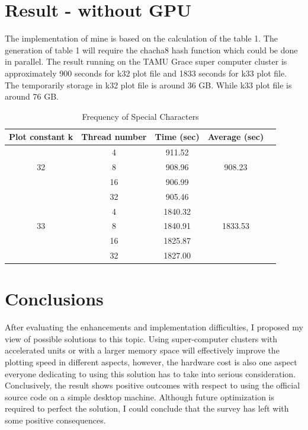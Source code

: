 \documentclass[sigconf, nonacm, natbib=false]{acmart}
\begin{document}
\section{Result - without GPU}
The implementation of mine is based on the calculation of the table 1. The generation of table 1 will require the chacha8 hash function which could be done in parallel. The result running on the TAMU Grace super computer cluster is approximately 900 seconds for k32 plot file and 1833 seconds for k33 plot file. The temporarily storage in k32 plot file is around 36 GB. While k33 plot file is around 76 GB. 
\begin{table}
  \caption{Frequency of Special Characters}
  \label{tab:freq}
  \begin{tabular}{ccccl}
    \toprule
    Plot constant k&Thread number&Time (sec)&Average (sec)\\
    \midrule
      & 4   & 911.52 &       \\
    32& 8   & 908.96 & 908.23\\
      & 16  & 906.99 &       \\
      & 32  & 905.46 &       \\
  \bottomrule
      & 4   & 1840.32 &         \\
    33& 8   & 1840.91 & 1833.53 \\
      & 16  & 1825.87 &         \\
      & 32  & 1827.00 &         \\
\bottomrule
\end{tabular}
\end{table}


\section{Conclusions}
After evaluating the enhancements and implementation difficulties, I proposed my view of possible solutions to this topic. Using super-computer clusters with accelerated units or with a larger memory space will effectively improve the plotting speed in different aspects, however, the hardware cost is also one aspect everyone dedicating to using this solution has to take into serious consideration.  \\
Conclusively, the result shows positive outcomes with respect to using the official source code on a simple desktop machine. Although future optimization is required to perfect the solution, I could conclude that the survey has left with some positive consequences.
\parencite{chia_github} \parencite*[]{chia_github_doc} 
\parencite{2_vdf}
\end{document}
